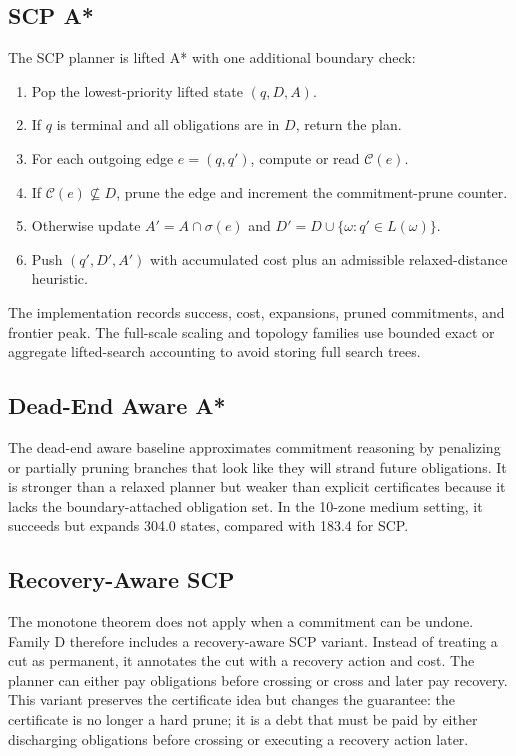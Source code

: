 \documentclass{article}
\newcommand{\cert}{\mathcal{C}}
\newcommand{\survive}{\sigma}
\begin{document}
\subsection{SCP A*}

The SCP planner is lifted A* with one additional boundary check:
\begin{enumerate}
  \item Pop the lowest-priority lifted state $(q,D,A)$.
  \item If $q$ is terminal and all obligations are in $D$, return the plan.
  \item For each outgoing edge $e=(q,q')$, compute or read $\cert(e)$.
  \item If $\cert(e)\nsubseteq D$, prune the edge and increment the commitment-prune counter.
  \item Otherwise update $A'=A\cap\survive(e)$ and $D'=D\cup\{\omega:q'\in L(\omega)\}$.
  \item Push $(q',D',A')$ with accumulated cost plus an admissible relaxed-distance heuristic.
\end{enumerate}
The implementation records success, cost, expansions, pruned commitments, and frontier peak. The full-scale scaling and topology families use bounded exact or aggregate lifted-search accounting to avoid storing full search trees.

\subsection{Dead-End Aware A*}

The dead-end aware baseline approximates commitment reasoning by penalizing or partially pruning branches that look like they will strand future obligations. It is stronger than a relaxed planner but weaker than explicit certificates because it lacks the boundary-attached obligation set. In the 10-zone medium setting, it succeeds but expands 304.0 states, compared with 183.4 for SCP.

\subsection{Recovery-Aware SCP}

The monotone theorem does not apply when a commitment can be undone. Family D therefore includes a recovery-aware SCP variant. Instead of treating a cut as permanent, it annotates the cut with a recovery action and cost. The planner can either pay obligations before crossing or cross and later pay recovery. This variant preserves the certificate idea but changes the guarantee: the certificate is no longer a hard prune; it is a debt that must be paid by either discharging obligations before crossing or executing a recovery action later.
\end{document}
